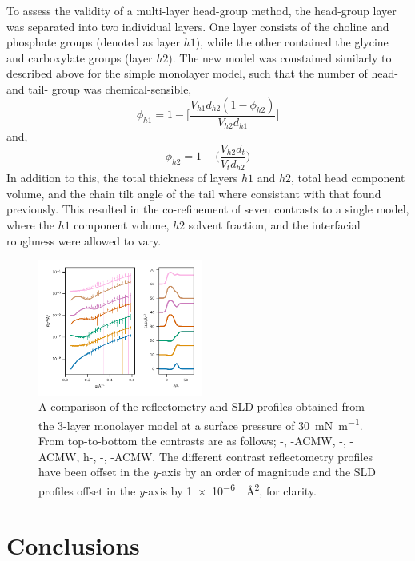 \documentclass[twoside,twocolumn,9pt]{article}
\begin{document}
To assess the validity of a multi-layer head-group method, the head-group layer was separated into two individual layers.
One layer consists of the choline and phosphate groups (denoted as layer $h1$), while the other contained the glycine and carboxylate groups (layer $h2$).
The new model was constained similarly to described above for the simple monolayer model, such that the number of head- and tail- group was chemical-sensible,
%
\begin{equation}
  \phi_{h1} = 1 - \Bigg[\frac{V_{h1}d_{h2}(1-\phi_{h2})}{V_{h2}d_{h1}}\Bigg]
\end{equation}
%
and,
%
\begin{equation}
  \phi_{h2} = 1 - \Bigg(\frac{V_{h2}d_{t}}{V_{t}d_{h2}}\Bigg)
\end{equation}
%
In addition to this, the total thickness of layers $h1$ and $h2$, total head component volume, and the chain tilt angle of the tail where consistant with that found previously.
This resulted in the co-refinement of seven contrasts to a single model, where the $h1$ component volume, $h2$ solvent fraction, and the interfacial roughness were allowed to vary.

%
\begin{figure}[h]
\centering
  \includegraphics[width=0.48\textwidth]{figures/trad_30_mod}
  \caption{A comparison of the reflectometry and SLD profiles obtained from the 3-layer monolayer model at a surface pressure of \SI{30}{\milli\newton\per\meter}. From top-to-bottom the contrasts are as follows; -, -ACMW, -, -ACMW, h-, -, -ACMW. The different contrast reflectometry profiles have been offset in the \emph{y}-axis by an order of magnitude and the SLD profiles offset in the \emph{y}-axis by \SI{1e-6}{\per\square\angstrom}, for clarity.}
  \label{fig:mod}
\end{figure}
%



\section{Conclusions}
\end{document}

